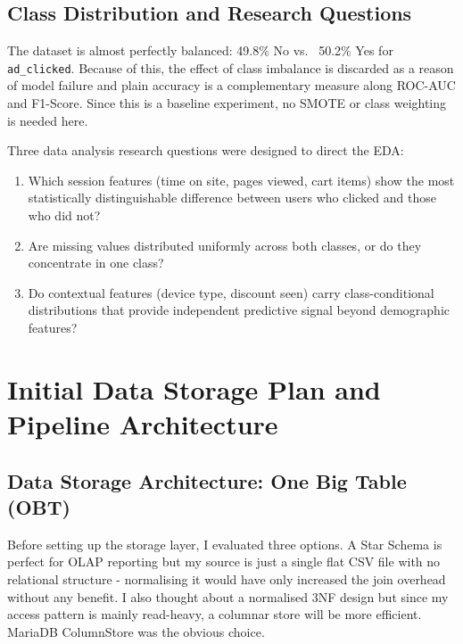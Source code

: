 \documentclass[12pt,a4paper]{article}
\begin{document}
\subsection{Class Distribution and Research Questions}

The dataset is almost perfectly balanced: 49.8\% No vs. \ 50.2\% Yes for \texttt{ad\_clicked}.
Because of this, the effect of class imbalance is discarded as a reason of model failure and plain accuracy is a
complementary measure along ROC-AUC and F1-Score. Since this is a baseline experiment, no SMOTE or class weighting is needed here.

Three data analysis research questions were designed to direct the EDA:

\begin{enumerate}[leftmargin=*, label=\textbf{RQ\arabic*.}, itemsep=4pt]
  \item Which session features (time on site, pages viewed, cart items) show the most
    statistically distinguishable difference between users who clicked and those who did not?
  \item Are missing values distributed uniformly across both classes, or do they
    concentrate in one class?
  \item Do contextual features (device type, discount seen) carry class-conditional
    distributions that provide independent predictive signal beyond demographic features?
\end{enumerate}

\section{Initial Data Storage Plan and Pipeline Architecture}

\subsection{Data Storage Architecture: One Big Table (OBT)}

Before setting up the storage layer, I evaluated three options.
A Star Schema is perfect for OLAP reporting but my source is just a single flat
CSV file with no relational structure - normalising it would have only increased the join overhead without any benefit.
I also thought about a normalised 3NF design but since my access pattern is mainly read-heavy, a columnar store will be more efficient.
MariaDB ColumnStore was the obvious choice.
\end{document}
